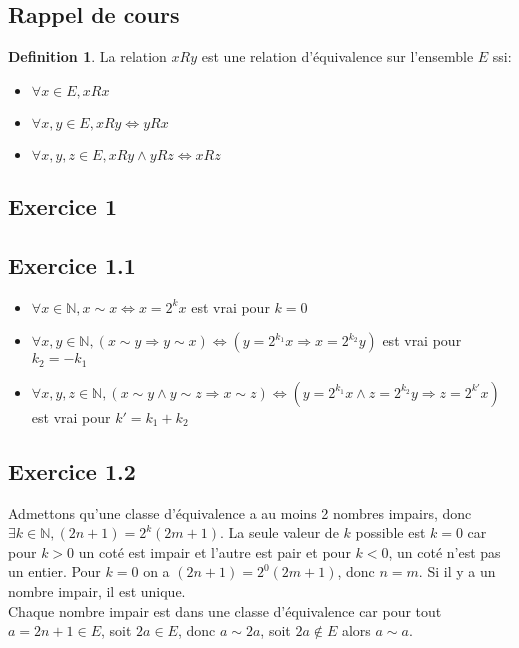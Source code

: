 \documentclass[]{book}
\theoremstyle{definition}
\newtheorem{defn}{Definition}
\newcommand{\bb}[1]{\mathbb{#1}}
\newcommand{\N}{\bb{N}}
\begin{document}
\subsection*{Rappel de cours}

\begin{defn}
La relation $xRy$ est une relation d'\'equivalence sur l'ensemble $E$ ssi:
\begin{itemize}
\item $\forall x \in E, xRx$
\item $\forall x,y \in E, xRy \Leftrightarrow yRx$
\item $\forall x,y,z \in E, xRy \wedge yRz \Leftrightarrow xRz$
\end{itemize}
\end{defn}


\newpage
\subsection*{Exercice 1}
\subsection*{Exercice 1.1}
\begin{itemize}
\item $\forall x \in \N, x\sim x \Leftrightarrow x = 2^kx$ est vrai pour $k=0$
\item $\forall x,y \in \N, (x\sim y \Rightarrow y\sim x) \Leftrightarrow (y=2^{k_1}x  \Rightarrow x = 2^{k_2}y)$ est vrai pour $k_2 = -k_1$
\item $\forall x,y,z \in \N, (x\sim y \wedge y\sim z \Rightarrow x\sim z) \Leftrightarrow (y = 2^{k_1}x \wedge z = 2^{k_2}y \Rightarrow z = 2^{k'}x)$ est vrai pour $k'=k_1+k_2$
\end{itemize}


\subsection*{Exercice 1.2}
Admettons qu'une classe d'\'equivalence a au moins 2 nombres impairs, donc $\exists k \in \N, (2n+1) = 2^k(2m+1)$. La seule valeur de $k$ possible est $k=0$ car pour $k>0$ un cot\'e est impair et l'autre est pair et pour $k<0$, un cot\'e n'est pas un entier. Pour $k=0$ on a $(2n+1)=2^0(2m+1)$, donc $n=m$. Si il y a un nombre impair, il est unique.\\

Chaque nombre impair est dans une classe d'\'equivalence car pour tout $a=2n+1 \in E$, soit $2a \in E$, donc $a \sim 2a$, soit $2a \not\in E$ alors $a \sim a$.\\
\end{document}
